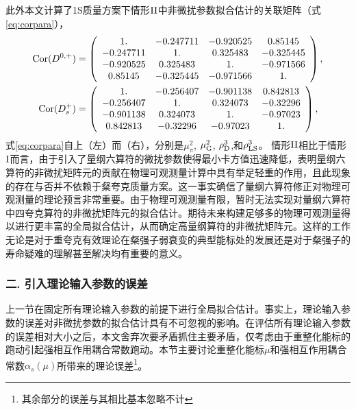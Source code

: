     此外本文计算了1S质量方案下情形$\mathrm{II}$中非微扰参数拟合估计的关联矩阵（式\eqref{eq:corpara}），
    \begin{align}\label{eq:corpara}
        {\rm Cor}(D^{0,+})&=
        \left(\begin{array}{cccc}
        1 . & -0.247711 & -0.920525 & 0.85145 \\
        -0.247711 & 1 . & 0.325483 & -0.325445 \\
        -0.920525 & 0.325483 & 1 . & -0.971566 \\
        0.85145 & -0.325445 & -0.971566 & 1 .
        \end{array}\right), \\
        {\rm Cor}(D_{s}^+)&=
        \left(\begin{array}{cccc}
        1 . & -0.256407 & -0.901138 & 0.842813 \\
        -0.256407 & 1 . & 0.324073 & -0.32296 \\
        -0.901138 & 0.324073 & 1 . & -0.97023 \\
        0.842813 & -0.32296 & -0.97023 & 1 .
        \end{array}\right), \nonumber
        \end{align}
        式\eqref{eq:corpara}自上（左）而（右），分别是$\mu_{\pi}^{2}$, $\mu_{\mathrm{G}}^{2}$, $\rho_{\mathrm{D}}^{3}$,和$\rho_{\mathrm{LS}}^3$。
    情形$\mathrm{II}$相比于情形$\mathrm{I}$而言，由于引入了量纲六算符的微扰参数使得最小卡方值迅速降低，表明量纲六算符的非微扰矩阵元的贡献在物理可观测量计算中具有举足轻重的作用，且此现象的存在与否并不依赖于粲夸克质量方案。这一事实确信了量纲六算符修正对物理可观测量的理论预言非常重要。由于物理可观测量有限，暂时无法实现对量纲六算符中四夸克算符的非微扰矩阵元的拟合估计。期待未来构建足够多的物理可观测量得以进行更丰富的全局拟合估计，从而确定高量纲算符的非微扰矩阵元。这样的工作无论是对于重夸克有效理论在粲强子弱衰变的典型能标处的发展还是对于粲强子的寿命疑难的理解甚至解决均有重要的意义。
\subsubsection{二. 引入理论输入参数的误差}
上一节在固定所有理论输入参数的前提下进行全局拟合估计。事实上，理论输入参数的误差对非微扰参数的拟合估计具有不可忽视的影响。在评估所有理论输入参数的误差相对大小之后，本文舍弃次要矛盾抓住主要矛盾，仅考虑由于重整化能标的跑动引起强相互作用耦合常数跑动。本节主要讨论重整化能标$\mu$和强相互作用耦合常数$\alpha_s(\mu)$所带来的理论误差\footnote{其余部分的误差与其相比基本忽略不计}。

